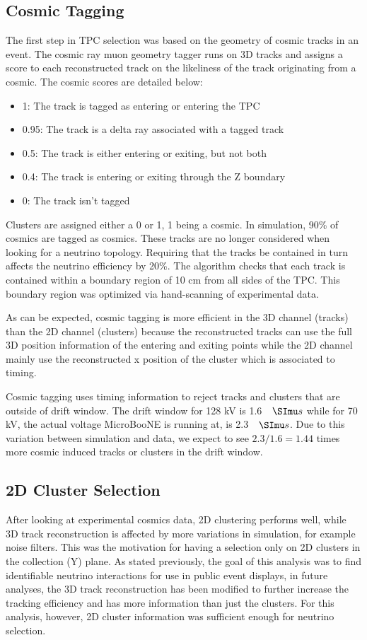 \subsection{Cosmic Tagging}
The first step in TPC selection was based on the geometry of cosmic tracks in an event. The cosmic ray muon geometry tagger runs on 3D tracks and assigns a score to each reconstructed track on the likeliness of the track originating from a cosmic. The cosmic scores are detailed below:
\begin{itemize}
\item 1: The track is tagged as entering or entering the TPC
\item 0.95: The track is a delta ray associated with a tagged track
\item 0.5: The track is either entering or exiting, but not both
\item 0.4: The track is entering or exiting through the Z boundary
\item 0: The track isn't tagged
\end{itemize}
Clusters are assigned either a 0 or 1, 1 being a cosmic. In simulation, 90\% of cosmics are tagged as cosmics. These tracks are no longer considered when looking for a neutrino topology. Requiring that the tracks be contained in turn affects the neutrino efficiency by 20\%. The algorithm checks that each track is contained within a boundary region of 10 cm from all sides of the TPC. This boundary region was optimized via hand-scanning of experimental data.

As can be expected, cosmic tagging is more efficient in the 3D channel (tracks) than the 2D channel (clusters) because the reconstructed tracks can use the full 3D position information of the entering and exiting points while the 2D channel mainly use the reconstructed x position of the cluster which is associated to timing. 

Cosmic tagging uses timing information to reject tracks and clusters that are outside of drift window. The drift window for 128 kV is 1.6 $\micro s$ while for 70 kV, the actual voltage MicroBooNE is running at, is 2.3 $\micro s$. Due to this variation between simulation and data, we expect to see $2.3/1.6 = 1.44$ times more cosmic induced tracks or clusters in the drift window. 
\subsection{2D Cluster Selection}
After looking at experimental cosmics data, 2D clustering performs well, while 3D track reconstruction is affected by more variations in simulation, for example noise filters. This was the motivation for having a selection only on 2D clusters in the collection (Y) plane. As stated previously, the goal of this analysis was to find identifiable neutrino interactions for use in public event displays, in future analyses, the 3D track reconstruction has been modified to further increase the tracking efficiency and has more information than just the clusters. For this analysis, however, 2D cluster information was sufficient enough for neutrino selection. 

